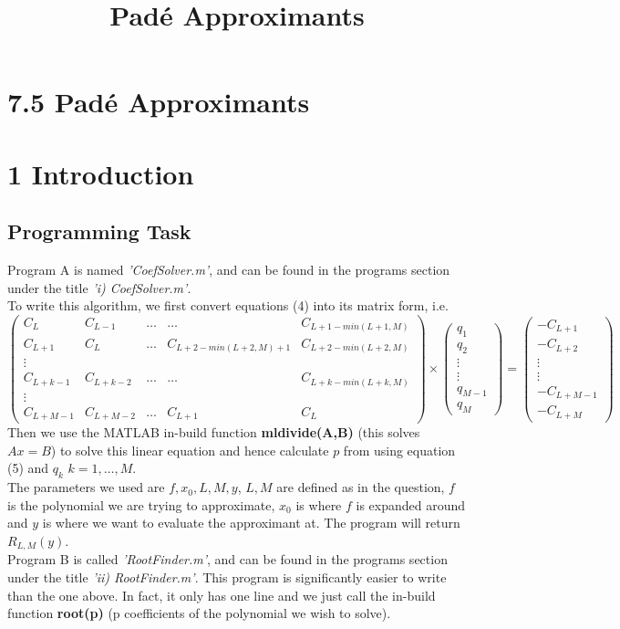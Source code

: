 \documentclass[10pt]{article}
\title{\flushleft7.5 Pad\'{e} Approximants\\ }
\date{}
\begin{document}
\section*{\LARGE{7.5 Pad\'{e} Approximants}}
\bigskip
\section*{1 Introduction}
\medskip
\subsection*{Programming Task}
Program A is named \emph{'CoefSolver.m'}, and can be found in the programs section under the title \emph{'i) CoefSolver.m'}.\\
To write this algorithm, we first convert equations (4) into its matrix form, i.e. 
\[ \begin{pmatrix}
C_L & C_{L-1} & \dots & \dots & C_{L+1-min(L+1,M)} \\
C_{L+1} & C_{L} & \dots & C_{L+2-min(L+2,M)+1} & C_{L+2-min(L+2,M)} \\
\vdots\\
C_{L+k-1} & C_{L+k-2} & \dots & \dots & C_{L+k-min(L+k,M)}\\
\vdots\\
C_{L+M-1} & C_{L+M-2} & \dots & C_{L+1} & C_{L}
\end{pmatrix} \times
\begin{pmatrix}
q_1\\
q_2\\
\vdots\\
\vdots\\
q_{M-1}\\
q_M
\end{pmatrix} =
\begin{pmatrix}
-C_{L+1}\\
-C_{L+2}\\
\vdots\\
\vdots\\
-C_{L+M-1}\\
-C_{L+M}
\end{pmatrix}
\]
Then we use the MATLAB in-build function \textbf{mldivide(A,B)} (this solves $Ax=B$) to solve this linear equation and hence calculate $p$ from using equation (5) and $q_k$ $k=1,\dots,M$.\\
The parameters we used are $f,x_0,L,M,y$, $L,M$ are defined as in the question, $f$ is the polynomial we are trying to approximate, $x_0$ is where $f$ is expanded around and $y$ is where we want to evaluate the approximant at. The program will return $R_{L,M}(y)$.\\
Program B is called \emph{'RootFinder.m'}, and can be found in the programs section under the title \emph{'ii) RootFinder.m'}. This program is significantly easier to write than the one above. In fact, it only has one line and we just call the in-build function \textbf{root(p)} (p coefficients of the polynomial we wish to solve).
\end{document}

